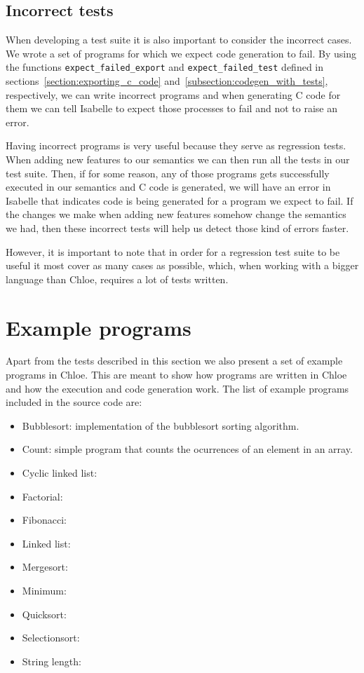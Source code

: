\subsection{Incorrect tests}

When developing a test suite it is also important to consider the incorrect cases.
We wrote a set of programs for which we expect code generation to fail.
By using the functions \verb|expect_failed_export| and \verb|expect_failed_test| defined in sections~\ref{section:exporting_c_code} and~\ref{subsection:codegen_with_tests}, respectively, we can write incorrect programs and when generating C code for them we can tell Isabelle to expect those processes to fail and not to raise an error.

Having incorrect programs is very useful because they serve as regression tests.
When adding new features to our semantics we can then run all the tests in our test suite.
Then, if for some reason, any of those programs gets successfully executed in our semantics and C code is generated, we will have an error in Isabelle that indicates code is being generated for a program we expect to fail.
If the changes we make when adding new features somehow change the semantics we had, then these incorrect tests will help us detect those kind of errors faster.

However, it is important to note that in order for a regression test suite to be useful it most cover as many cases as possible, which, when working with a bigger language than Chloe, requires a lot of tests written.

\section{Example programs}

Apart from the tests described in this section we also present a set of example programs in Chloe.
This are meant to show how programs are written in Chloe and how the execution and code generation work.
The list of example programs included in the source code are:

\begin{itemize}
  \item{Bubblesort: implementation of the bubblesort sorting algorithm.}
  \item{Count: simple program that counts the ocurrences of an element in an array.}
  \item{Cyclic linked list:}
  \item{Factorial:}
  \item{Fibonacci:}
  \item{Linked list:}
  \item{Mergesort:}
  \item{Minimum:}
  \item{Quicksort:}
  \item{Selectionsort:}
  \item{String length:}
\end{itemize}

